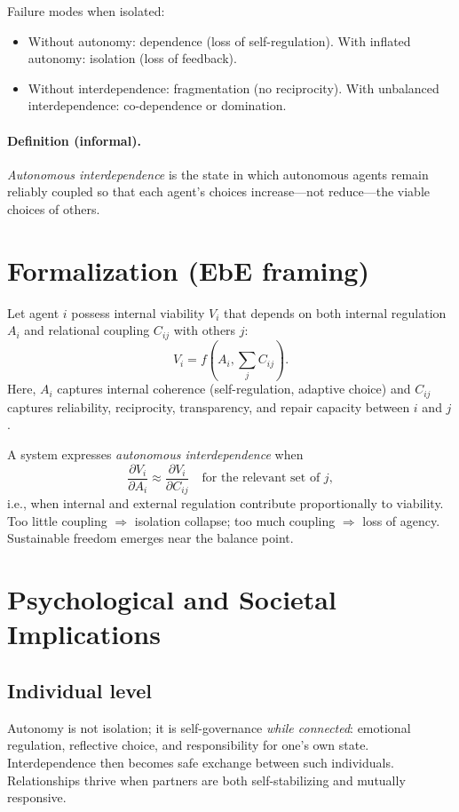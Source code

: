 \documentclass[11pt,a4paper]{article}
\begin{document}
\noindent Failure modes when isolated:
\begin{itemize}
    \item Without autonomy: dependence (loss of self-regulation). With inflated autonomy: isolation (loss of feedback).
    \item Without interdependence: fragmentation (no reciprocity). With unbalanced interdependence: co-dependence or domination.
\end{itemize}

\paragraph{Definition (informal).}
\emph{Autonomous interdependence} is the state in which autonomous agents remain reliably coupled so that each agent's choices increase---not reduce---the viable choices of others.

\section{Formalization (EbE framing)}
Let agent $i$ possess internal viability $V_i$ that depends on both internal regulation $A_i$ and relational coupling $C_{ij}$ with others $j$:
\begin{equation}
  V_i = f\!\left(A_i, \sum_{j} C_{ij}\right).
\end{equation}
Here, $A_i$ captures internal coherence (self-regulation, adaptive choice) and $C_{ij}$ captures reliability, reciprocity, transparency, and repair capacity between $i$ and $j$.

A system expresses \emph{autonomous interdependence} when
\begin{equation}
  \frac{\partial V_i}{\partial A_i} \approx \frac{\partial V_i}{\partial C_{ij}} \quad \text{for the relevant set of } j,
\end{equation}
i.e., when internal and external regulation contribute proportionally to viability.
Too little coupling $\Rightarrow$ isolation collapse; too much coupling $\Rightarrow$ loss of agency.
Sustainable freedom emerges near the balance point.

\section{Psychological and Societal Implications}
\subsection{Individual level}
Autonomy is not isolation; it is self-governance \emph{while connected}: emotional regulation, reflective choice, and responsibility for one's own state.
Interdependence then becomes safe exchange between such individuals.
Relationships thrive when partners are both self-stabilizing and mutually responsive.
\end{document}

